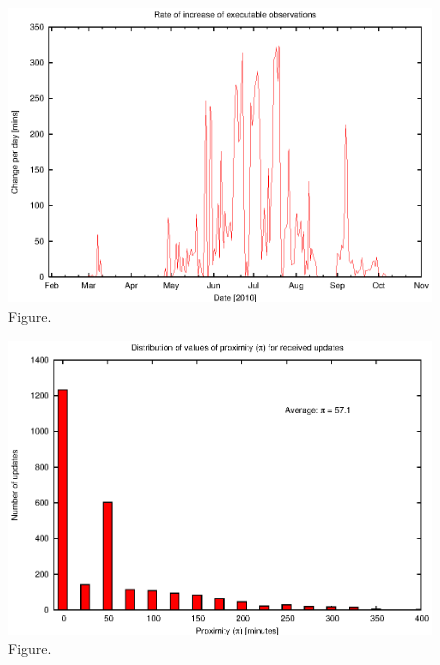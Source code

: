 \documentclass[12pt,a4paper]{article}
\begin{document}
\clearpage
\begin{figure}[htbp]
 \begin{center}
  \includegraphics[scale=1.0, angle=0]{figures/volexec.eps}
 \end{center}
  \caption[Figure.]
{Figure.}
\end{figure}
\clearpage
\begin{figure}[htbp]
 \begin{center}
  \includegraphics[scale=1.0, angle=0]{figures/vol_pi.eps}
 \end{center}
  \caption[Figure.]
{Figure.}
\end{figure}
\clearpage
\end{document}
